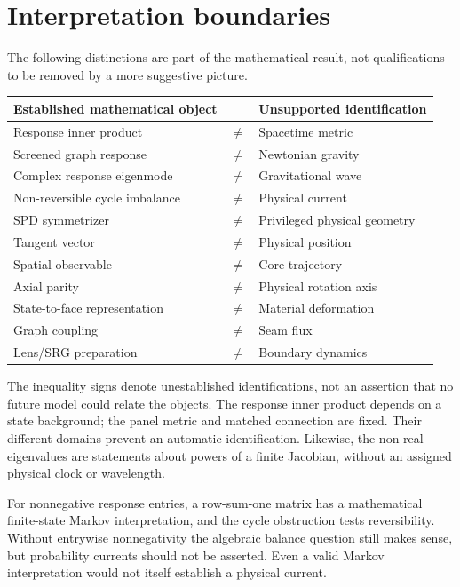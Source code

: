 \section{Interpretation boundaries}\label{sec:limits}
The following distinctions are part of the mathematical result, not qualifications to be removed by a more suggestive picture.
\begin{center}\small
\begin{tabularx}{\linewidth}{@{}XcX@{}}\toprule
Established mathematical object & & Unsupported identification\\\midrule
Response inner product &\(\ne\)& Spacetime metric\\
Screened graph response &\(\ne\)& Newtonian gravity\\
Complex response eigenmode &\(\ne\)& Gravitational wave\\
Non-reversible cycle imbalance &\(\ne\)& Physical current\\
SPD symmetrizer &\(\ne\)& Privileged physical geometry\\
Tangent vector &\(\ne\)& Physical position\\
Spatial observable &\(\ne\)& Core trajectory\\
Axial parity &\(\ne\)& Physical rotation axis\\
State-to-face representation &\(\ne\)& Material deformation\\
Graph coupling &\(\ne\)& Seam flux\\
Lens/SRG preparation &\(\ne\)& Boundary dynamics\\\bottomrule
\end{tabularx}
\end{center}
The inequality signs denote unestablished identifications, not an assertion that no future model could relate the objects. The response inner product depends on a state background; the panel metric and matched connection are fixed. Their different domains prevent an automatic identification. Likewise, the non-real eigenvalues are statements about powers of a finite Jacobian, without an assigned physical clock or wavelength.

For nonnegative response entries, a row-sum-one matrix has a mathematical finite-state Markov interpretation, and the cycle obstruction tests reversibility. Without entrywise nonnegativity the algebraic balance question still makes sense, but probability currents should not be asserted. Even a valid Markov interpretation would not itself establish a physical current.

